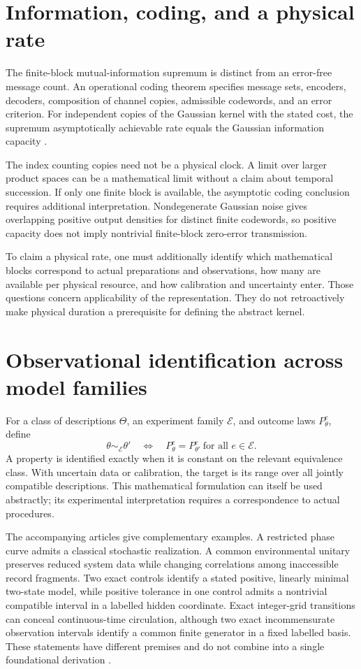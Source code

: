 \documentclass{article}
\begin{document}
\section{Information, coding, and a physical rate}
The finite-block mutual-information supremum is distinct from an error-free message count. An operational coding theorem specifies message sets, encoders, decoders, composition of channel copies, admissible codewords, and an error criterion. For independent copies of the Gaussian kernel with the stated cost, the supremum asymptotically achievable rate equals the Gaussian information capacity \cite{polyanskiy17}.

The index counting copies need not be a physical clock. A limit over larger product spaces can be a mathematical limit without a claim about temporal succession. If only one finite block is available, the asymptotic coding conclusion requires additional interpretation. Nondegenerate Gaussian noise gives overlapping positive output densities for distinct finite codewords, so positive capacity does not imply nontrivial finite-block zero-error transmission.

To claim a physical rate, one must additionally identify which mathematical blocks correspond to actual preparations and observations, how many are available per physical resource, and how calibration and uncertainty enter. Those questions concern applicability of the representation. They do not retroactively make physical duration a prerequisite for defining the abstract kernel.

\section{Observational identification across model families}
For a class of descriptions \(\Theta\), an experiment family \(\mathcal E\), and outcome laws \(P_\theta^e\), define
\[
\theta\sim_{\mathcal E}\theta'
\quad\Longleftrightarrow\quad
P_\theta^e=P_{\theta'}^e\ \text{for all }e\in\mathcal E.
\]
A property is identified exactly when it is constant on the relevant equivalence class. With uncertain data or calibration, the target is its range over all jointly compatible descriptions. This mathematical formulation can itself be used abstractly; its experimental interpretation requires a correspondence to actual procedures.

The accompanying articles give complementary examples. A restricted phase curve admits a classical stochastic realization. A common environmental unitary preserves reduced system data while changing correlations among inaccessible record fragments. Two exact controls identify a stated positive, linearly minimal two-state model, while positive tolerance in one control admits a nontrivial compatible interval in a labelled hidden coordinate. Exact integer-grid transitions can conceal continuous-time circulation, although two exact incommensurate observation intervals identify a common finite generator in a fixed labelled basis. These statements have different premises and do not combine into a single foundational derivation \cite{operational}.
\end{document}
